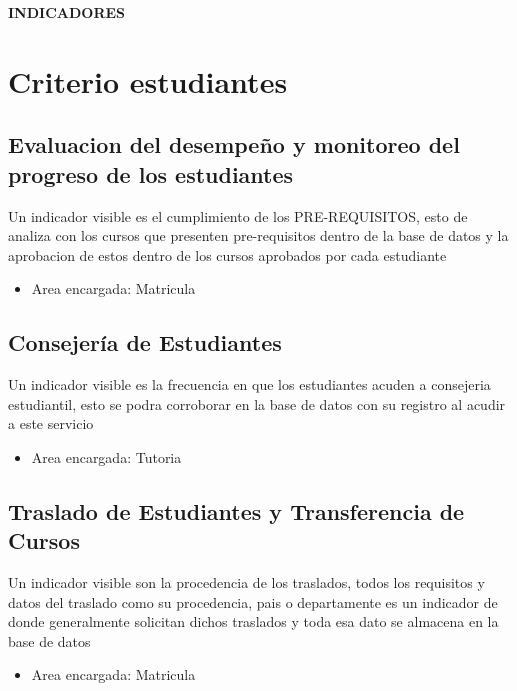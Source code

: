 \documentclass[12pt,a4paper]{report}
\begin{document}


\tableofcontents
\newpage

\begin{Large}
\textbf{INDICADORES} 
\end{Large}
\section{Criterio estudiantes}

\subsection{Evaluacion del desempeño y monitoreo del progreso de los estudiantes}
Un indicador visible es el cumplimiento de los PRE-REQUISITOS, esto de analiza con los cursos que presenten pre-requisitos dentro de la base de datos y la aprobacion de estos dentro de los cursos aprobados por cada estudiante
\begin{itemize}
\item Area encargada: Matricula

\end{itemize}
\subsection{Consejería de Estudiantes}
Un indicador visible es la frecuencia en que los estudiantes acuden a consejeria estudiantil, esto se podra corroborar en la base de datos con su registro al acudir a este servicio
\begin{itemize}
\item Area encargada: Tutoria

\end{itemize}
\subsection{Traslado de Estudiantes y Transferencia de Cursos}
Un indicador visible son la procedencia de los traslados, todos los requisitos y datos del traslado como su procedencia, pais o departamente es un indicador de donde generalmente solicitan dichos traslados y toda esa dato se almacena en la base de datos
\begin{itemize}
\item Area encargada: Matricula

\end{itemize}
\end{document}
